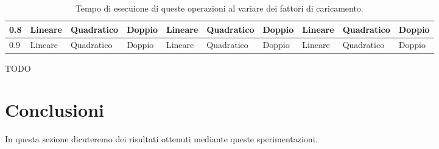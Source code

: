 \documentclass{article}
\begin{document}
\begin{center}
\begin{table}[H]
\begin{tabular}{l|l|l|l|l|l|l|l|l|l|}
\hline
\multicolumn{1}{|l|}{\textbf{0.8}} & Lineare & Quadratico & Doppio & Lineare & Quadratico & Doppio  & Lineare & Quadratico & Doppio \\
\hline
\multicolumn{1}{|l|}{0.9} & Lineare & Quadratico & Doppio & Lineare & Quadratico & Doppio  & Lineare & Quadratico & Doppio \\
\hline
\end{tabular}
\label{tab:Confronto_tempi}
\caption{Tempo di esecuione di queste operazioni al variare dei fattori di caricamento.}
\end{table}
\end{center}


\begin{Huge}
TODO
\end{Huge}
\section{Conclusioni}
In questa sezione dicuteremo dei risultati ottenuti mediante queste sperimentazioni.
\end{document}

